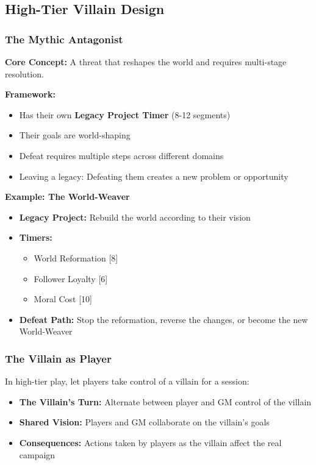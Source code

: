 \documentclass[10pt]{article}
\begin{document}
\subsection{High-Tier Villain Design}

\subsubsection{The Mythic Antagonist}

\textbf{Core Concept:} A threat that reshapes the world and requires multi-stage resolution.

\textbf{Framework:}
\begin{itemize}
  \item Has their own \textbf{Legacy Project Timer } (8-12 segments)
  \item Their goals are world-shaping
  \item Defeat requires multiple steps across different domains
  \item Leaving a legacy: Defeating them creates a new problem or opportunity
\end{itemize}

\textbf{Example: The World-Weaver}
\begin{itemize}
  \item \textbf{Legacy Project:} Rebuild the world according to their vision
  \item \textbf{Timers:}
    \begin{itemize}
      \item World Reformation [8]
      \item Follower Loyalty [6]
      \item Moral Cost [10]
    \end{itemize}
  \item \textbf{Defeat Path:} Stop the reformation, reverse the changes, or become the new World-Weaver
\end{itemize}

\subsubsection{The Villain as Player}

In high-tier play, let players take control of a villain for a session:

\begin{itemize}
  \item \textbf{The Villain's Turn:} Alternate between player and GM control of the villain
  \item \textbf{Shared Vision:} Players and GM collaborate on the villain's goals
  \item \textbf{Consequences:} Actions taken by players as the villain affect the real campaign
\end{itemize}
\end{document}
